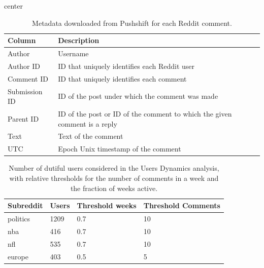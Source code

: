 \documentclass[fleqn,10pt]{wlscirep}
\begin{document}
%
\begin{table}[h!]
	\centering
     \begin{adjustbox}{center}
    \end{adjustbox}
    \caption{Wikipedia pages retrieved and Google Trends keywords queried for the relative subreddit community.} 
\label{tab_sm_data_pages}
\end{table}
%
\begin{table}[h!]
	\centering
	\begin{tabular}{lp{}}
		\toprule
		{\textbf{Column}} & {\textbf{Description}}\\
		\midrule
		Author &  Username\\
		Author ID & ID that uniquely identifies each Reddit user\\
		Comment ID & ID that uniquely identifies each comment\\
		Submission ID &	ID of the post under which the comment was made\\
		Parent ID &	ID of the post or ID of the comment to which the given comment is a reply\\
		Text & Text of the comment\\
		UTC & Epoch Unix timestamp of the comment\\
		\hline 
	\end{tabular}
\caption{Metadata downloaded from Pushshift for each Reddit comment.} 
\label{tab_sm_data_comments}
\end{table}
%
\begin{table}[h!]
	\centering
	\begin{tabular}{llll}
		\toprule
        {\textbf{Subreddit}} & {\textbf{Users}} & {\textbf{Threshold weeks}} & {\textbf{Threshold Comments}}\\
        \midrule
        politics & 1209 & 0.7 & 10\\
        nba & 416 & 0.7 & 10\\
        nfl & 535 & 0.7 & 10\\
        europe & 403 & 0.5 & 5\\
        \hline 
	\end{tabular}
    \caption{Number of dutiful users considered in the Users Dynamics analysis, with relative thresholds for the number of comments in a week and the fraction of weeks active.} 
\label{tab_sm_users_ud}
\end{table}
\pagebreak[2]
\clearpage
\end{document}
